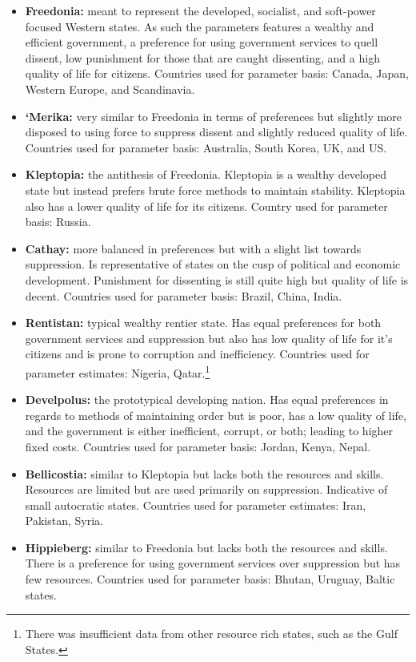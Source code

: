 \documentclass[12pt]{article}
\begin{document}
\begin{spacing}{1.5}
\begin{itemize}
	\item \textbf{Freedonia:} meant to represent the developed, socialist, and soft-power focused Western states. As such the parameters features a wealthy and efficient government, a preference for using government services to quell dissent, low punishment for those that are caught dissenting, and a high quality of life for citizens. Countries used for parameter basis: Canada, Japan, Western Europe, and Scandinavia. 
	\item \textbf{`Merika:} very similar to Freedonia in terms of preferences but slightly more disposed to using force to suppress dissent and slightly reduced quality of life. Countries used for parameter basis: Australia, South Korea, UK, and US. 
	\item \textbf{Kleptopia:} the antithesis of Freedonia. Kleptopia is a wealthy developed state but instead prefers brute force methods to maintain stability. Kleptopia also has a lower quality of life for its citizens. Country used for parameter basis: Russia.  
	\item \textbf{Cathay:} more balanced in preferences but with a slight list towards suppression. Is representative of states on the cusp of political and economic development. Punishment for dissenting is still quite high but quality of life is decent. Countries used for parameter basis: Brazil, China, India.   
	\item \textbf{Rentistan:} typical wealthy rentier state. Has equal preferences for both government services and suppression but also has low quality of life for it's citizens and is prone to corruption and inefficiency. Countries used for parameter estimates: Nigeria, Qatar.\footnote{There was insufficient data from other resource rich states, such as the Gulf States.} 
	\item \textbf{Develpolus:} the prototypical developing nation. Has equal preferences in regards to methods of maintaining order but is poor, has a low quality of life, and the government is either inefficient, corrupt, or both; leading to higher fixed costs. Countries used for parameter basis: Jordan, Kenya, Nepal.  	
	\item \textbf{Bellicostia:} similar to Kleptopia but lacks both the resources and skills. Resources are limited but are used primarily on suppression. Indicative of small autocratic states.  Countries used for parameter estimates: Iran, Pakistan, Syria. 
	\item \textbf{Hippieberg:} similar to Freedonia but lacks both the resources and skills. There is a preference for using government services over suppression but has few resources. Countries used for parameter basis: Bhutan, Uruguay, Baltic states.  
\end{itemize}


\end{spacing}
\end{document}
